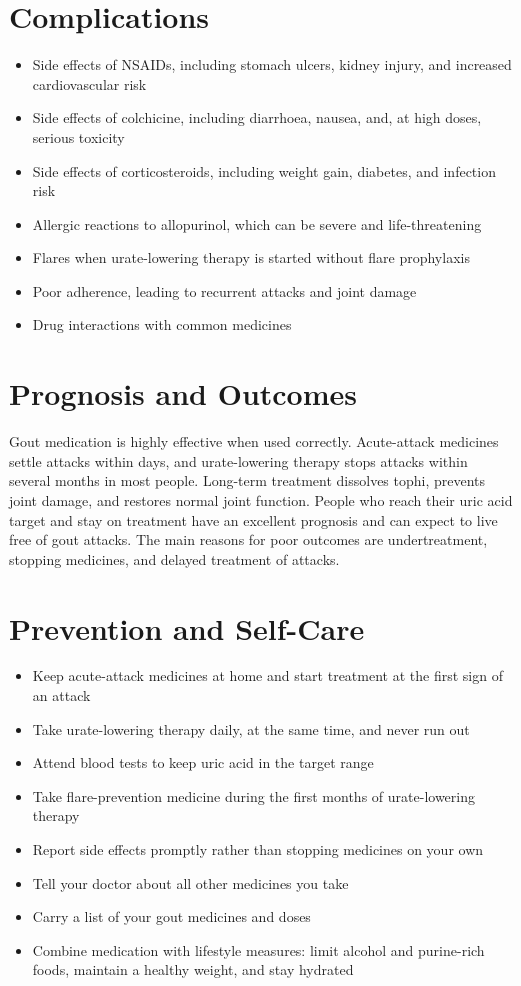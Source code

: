 \section*{Complications}
\begin{itemize}
    \item Side effects of NSAIDs, including stomach ulcers, kidney injury, and increased cardiovascular risk
    \item Side effects of colchicine, including diarrhoea, nausea, and, at high doses, serious toxicity
    \item Side effects of corticosteroids, including weight gain, diabetes, and infection risk
    \item Allergic reactions to allopurinol, which can be severe and life-threatening
    \item Flares when urate-lowering therapy is started without flare prophylaxis
    \item Poor adherence, leading to recurrent attacks and joint damage
    \item Drug interactions with common medicines
\end{itemize}

\section*{Prognosis and Outcomes}
Gout medication is highly effective when used correctly. Acute-attack medicines settle attacks within days, and urate-lowering therapy stops attacks within several months in most people. Long-term treatment dissolves tophi, prevents joint damage, and restores normal joint function. People who reach their uric acid target and stay on treatment have an excellent prognosis and can expect to live free of gout attacks. The main reasons for poor outcomes are undertreatment, stopping medicines, and delayed treatment of attacks.

\section*{Prevention and Self-Care}
\begin{itemize}
    \item Keep acute-attack medicines at home and start treatment at the first sign of an attack
    \item Take urate-lowering therapy daily, at the same time, and never run out
    \item Attend blood tests to keep uric acid in the target range
    \item Take flare-prevention medicine during the first months of urate-lowering therapy
    \item Report side effects promptly rather than stopping medicines on your own
    \item Tell your doctor about all other medicines you take
    \item Carry a list of your gout medicines and doses
    \item Combine medication with lifestyle measures: limit alcohol and purine-rich foods, maintain a healthy weight, and stay hydrated
\end{itemize}

